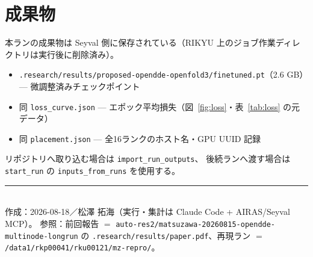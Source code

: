 \documentclass[11pt]{article}
\begin{document}
\section{成果物}

本ランの成果物は Seyval 側に保存されている（RIKYU 上のジョブ作業ディレクトリは実行後に削除済み）。

\begin{itemize}
  \item \texttt{.research/results/proposed-opendde-openfold3/finetuned.pt}（2.6 GB）--- 微調整済みチェックポイント
  \item 同 \texttt{loss\_curve.json} --- エポック平均損失（図~\ref{fig:loss}・表~\ref{tab:loss} の元データ）
  \item 同 \texttt{placement.json} --- 全16ランクのホスト名・GPU UUID 記録
\end{itemize}

リポジトリへ取り込む場合は \texttt{import\_run\_outputs}、
後続ランへ渡す場合は \texttt{start\_run} の \texttt{inputs\_from\_runs} を使用する。

\vspace{2em}
\noindent\rule{\linewidth}{0.4pt}\\
{\small
作成：2026-08-18／松澤 拓海（実行・集計は Claude Code + AIRAS/Seyval MCP）。
参照：前回報告 $=$ \texttt{auto-res2/matsuzawa-20260815-opendde-multinode-longrun} の
\texttt{.research/results/paper.pdf}、再現ラン $=$ \texttt{/data1/rkp00041/rku00121/mz-repro/}。}
\end{document}
